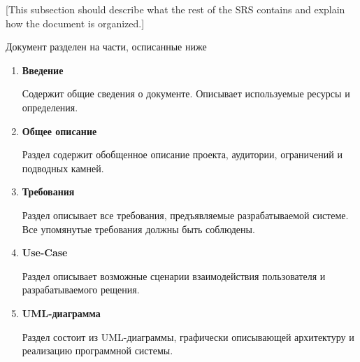 [This subsection should describe what the rest 
of the SRS contains and explain how the document 
is organized.]

Документ разделен на части, осписанные ниже
\begin{enumerate}
    \item \textbf{Введение}
    
    Содержит общие сведения о документе. Описывает используемые ресурсы и определения.
    \item \textbf{Общее описание}
    
    Раздел содержит обобщенное описание проекта, аудитории, ограничений и подводных камней.
    \item \textbf{Требования}
    
    Раздел описывает все требования, предъявляемые разрабатываемой системе. Все упомянутые требования должны быть соблюдены.
    \item \textbf{Use-Case}
    
    Раздел описывает возможные сценарии взаимодействия пользователя и разрабатываемого рещения.
    \item \textbf{UML-диаграмма}
    
    Раздел состоит из UML-диаграммы, графически описывающей архитектуру и реализацию программной системы.
\end{enumerate}